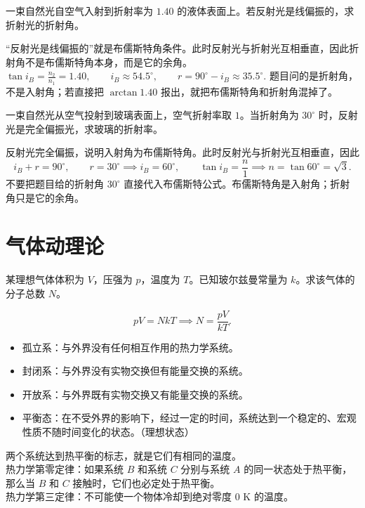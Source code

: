 \documentclass[lang=cn,11pt]{elegantbook}
\begin{document}
\begin{exercise}
一束自然光自空气入射到折射率为 \(1.40\) 的液体表面上。若反射光是线偏振的，求折射光的折射角。
\end{exercise}

\begin{solution}
“反射光是线偏振的”就是布儒斯特角条件。此时反射光与折射光互相垂直，因此折射角不是布儒斯特角本身，而是它的余角。
 \(\tan i_B=\frac{n_2}{n_1}=1.40,\qquad i_B\approx54.5^\circ,\qquad r=90^\circ-i_B\approx 35.5^\circ.\) 
题目问的是折射角，不是入射角；若直接把 \(\arctan1.40\) 报出，就把布儒斯特角和折射角混掉了。
\end{solution}

\begin{exercise}
一束自然光从空气投射到玻璃表面上，空气折射率取 \(1\)。当折射角为 \(30^\circ\) 时，反射光是完全偏振光，求玻璃的折射率。
\end{exercise}

\begin{solution}
反射光完全偏振，说明入射角为布儒斯特角。此时反射光与折射光互相垂直，因此
\[
i_B+r=90^\circ,\qquad
r=30^\circ\implies i_B=60^\circ,\qquad
\tan i_B=\frac{n}{1}
\implies
n=\tan60^\circ=\sqrt3.
\]
不要把题目给的折射角 \(30^\circ\) 直接代入布儒斯特公式。布儒斯特角是入射角；折射角只是它的余角。
\end{solution}

\chapter{气体动理论}

\begin{exercise}[已知 \(p,V,T\) 时怎样先数出分子总数]
某理想气体体积为 \(V\)，压强为 \(p\)，温度为 \(T\)。已知玻尔兹曼常量为 \(k\)。求该气体的分子总数 \(N\)。
\end{exercise}
\begin{solution}
 \[pV=NkT\implies N=\frac{pV}{kT}.\]
\end{solution}
\begin{definition}
\begin{itemize}
\item 孤立系：与外界没有任何相互作用的热力学系统。
\item 封闭系：与外界没有实物交换但有能量交换的系统。
\item 开放系：与外界既有实物交换又有能量交换的系统。
\item 平衡态：在不受外界的影响下，经过一定的时间，系统达到一个稳定的、宏观性质不随时间变化的状态。（理想状态）
\end{itemize}
两个系统达到热平衡的标志，就是它们有相同的温度。\\
热力学第零定律：如果系统 \(B\) 和系统 \(C\) 分别与系统 \(A\) 的同一状态处于热平衡，那么当 \(B\) 和 \(C\) 接触时，它们也必定处于热平衡。\\
热力学第三定律：不可能使一个物体冷却到绝对零度 \(0\text{ K}\) 的温度。
\end{definition}
\end{document}

